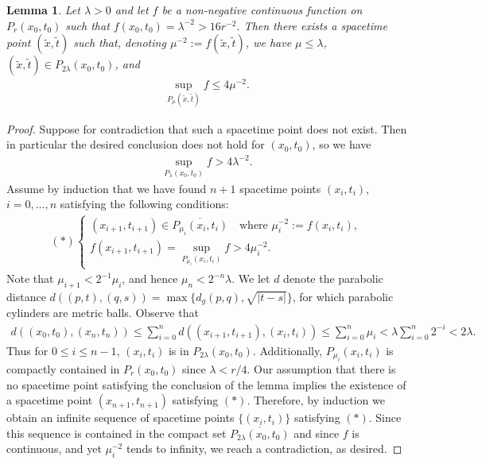 \documentclass[12pt]{amsart}
\renewcommand{\1}{{\mathbf 1}}
\newtheorem{lemma}[thm]{Lemma}
\theoremstyle{others}
\numberwithin{equation}{section}
\begin{document}
\begin{lemma}\label{lemma:comparablesup}
    Let \(\lambda > 0\) and let \(f\) be a non-negative continuous function on \(P_r(x_0, t_0)\) such that \(f(x_0, t_0) = \lambda^{-2} > 16r^{-2}\). Then there exists a spacetime point \((\tilde{x}, \tilde{t})\) such that, denoting \(\mu^{-2} := f(\tilde{x}, \tilde{t})\), we have \(\mu \leq \lambda\), \((\tilde{x}, \tilde{t}) \in P_{2\lambda}(x_0, t_0)\), and     \begin{align} \label{comparablesupbound}
\sup_{P_\mu(\tilde{x}, \tilde{t})} f \leq 4\mu^{-2}.
    \end{align}
\end{lemma}
\begin{proof}
    Suppose for %
    contradiction that such a spacetime point does not exist. Then in particular the desired conclusion does not hold for \((x_0, t_0)\), so we have
    \begin{align*}
        \sup_{P_\lambda(x_0, t_0)} f > 4\lambda^{-2}.
    \end{align*} Assume by induction that we have found \(n+1\) spacetime points \((x_i, t_i)\), \(i = 0, \ldots, n\) satisfying
    the following conditions:
    \begin{align*}
       (\ast) \begin{cases}
            (x_{i+1}, t_{i+1}) \in \overline{P_{\mu_i}(x_i, t_i)} \ \ \ \text{ where } \mu_i^{-2} := f(x_i, t_i), \\
            f(x_{i + 1}, t_{i+1}) = \sup_{P_{\mu_i}(x_i, t_i)} f > 4\mu_i^{-2}.
        \end{cases}
    \end{align*} Note that \(\mu_{i+1} < 2^{-1}\mu_i\), and hence \(\mu_n < 2^{-n}\lambda\). We let \(d\) denote the parabolic distance \(d((p, t), (q, s)) = \max\{d_g(p, q), \sqrt{|t-s|}\}\), for which parabolic cylinders are metric balls. Observe that 
    \begin{align*}
        d((x_0, t_0), (x_n, t_n)) \leq \sum_{i = 0}^n d((x_{i+1}, t_{i+1}), (x_i, t_i)) \leq \sum_{i = 0}^n \mu_i < \lambda \sum_{i = 0}^n 2^{-i} < 2\lambda.
    \end{align*} Thus for \(0 \leq i \leq n-1\), \((x_i, t_i)\) is in \(P_{2\lambda}(x_0, t_0)\). Additionally, \(P_{\mu_i}(x_i, t_i)\) is compactly contained in \(P_r(x_0, t_0)\) since \(\lambda < r/4\). Our assumption that there is no spacetime point satisfying the conclusion of the lemma implies the existence of a spacetime point \((x_{n+1}, t_{n+1})\) satisfying \((\ast)\). Therefore, by induction we obtain an infinite sequence of spacetime points \(\{(x_i, t_i)\}\) satisfying \((\ast)\). Since this sequence is contained in the compact set \(\overline{P_{2\lambda}(x_0, t_0)}\) and since \(f\) is continuous, and yet \(\mu_i^{-2}\) tends to infinity, we reach a contradiction, as desired.
\end{proof}
\end{document}
